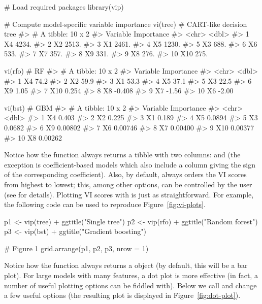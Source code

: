 \begin{example}
# Load required packages
library(vip)

# Compute model-specific variable importance
vi(tree)  # CART-like decision tree
#> # A tibble: 10 x 2
#>    Variable Importance
#>    <chr>         <dbl>
#>  1 X4            4234.
#>  2 X2            2513.
#>  3 X1            2461.
#>  4 X5            1230.
#>  5 X3             688.
#>  6 X6             533.
#>  7 X7             357.
#>  8 X9             331.
#>  9 X8             276.
#> 10 X10            275.

vi(rfo)   # RF
#> # A tibble: 10 x 2
#>    Variable Importance
#>    <chr>         <dbl>
#>  1 X4           74.2  
#>  2 X2           59.9  
#>  3 X1           53.3  
#>  4 X5           37.1  
#>  5 X3           22.5  
#>  6 X9            1.05 
#>  7 X10           0.254
#>  8 X8           -0.408
#>  9 X7           -1.56 
#> 10 X6           -2.00

vi(bst)   # GBM
#> # A tibble: 10 x 2
#>    Variable Importance
#>    <chr>         <dbl>
#>  1 X4          0.403  
#>  2 X2          0.225  
#>  3 X1          0.189  
#>  4 X5          0.0894 
#>  5 X3          0.0682 
#>  6 X9          0.00802
#>  7 X6          0.00746
#>  8 X7          0.00400
#>  9 X10         0.00377
#> 10 X8          0.00262
\end{example}

Notice how the  function always returns a tibble with two columns:  and  (the exception is coefficient-based models which also include a  column giving the sign of the corresponding coefficient). Also, by default,  always orders the VI scores from highest to lowest; this, among other options, can be controlled by the user (see  for details). Plotting VI scores with  is just as straightforward. For example, the following code can be used to reproduce Figure~\ref{fig:vi-plots}.

\begin{example}
p1 <- vip(tree) + ggtitle("Single tree")
p2 <- vip(rfo) + ggtitle("Random forest")
p3 <- vip(bst) + ggtitle("Gradient boosting")

# Figure 1
grid.arrange(p1, p2, p3, nrow = 1)
\end{example}

Notice how the  function always returns a  object (by default, this will be a bar plot). For large models with many features, a dot plot is more effective (in fact, a number of useful plotting options can be fiddled with). Below we call  and change a few useful options (the resulting plot is displayed in Figure~\ref{fig:dot-plot}).

